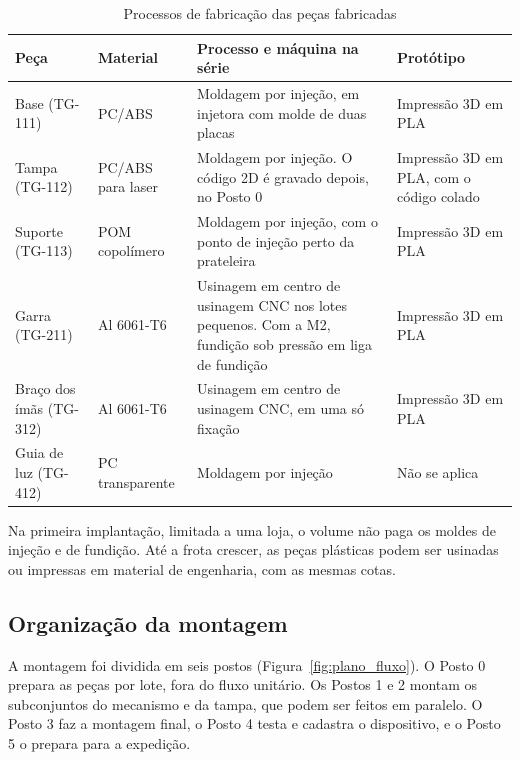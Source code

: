 \begin{table}[htbp]
    \centering
    \caption{Processos de fabricação das peças fabricadas}
    \label{tab:plano_processos}
    \footnotesize
    \renewcommand{\arraystretch}{1.3}
    \begin{tabularx}{\textwidth}{@{}
        >{\RaggedRight\arraybackslash}p{2.6cm}
        >{\RaggedRight\arraybackslash}p{2.5cm}
        >{\RaggedRight\arraybackslash}X
        >{\RaggedRight\arraybackslash}p{3.2cm}@{}}
        \toprule
        \textbf{Peça} & \textbf{Material} & \textbf{Processo e máquina na série} & \textbf{Protótipo} \\
        \midrule
        Base (TG-111) & PC/ABS & Moldagem por injeção, em injetora com molde de duas placas & Impressão 3D em PLA \\
        Tampa (TG-112) & PC/ABS para laser & Moldagem por injeção. O código 2D é gravado depois, no Posto 0 & Impressão 3D em PLA, com o código colado \\
        Suporte (TG-113) & POM copolímero & Moldagem por injeção, com o ponto de injeção perto da prateleira & Impressão 3D em PLA \\
        Garra (TG-211) & Al 6061-T6 & Usinagem em centro de usinagem CNC nos lotes pequenos. Com a M2, fundição sob pressão em liga de fundição & Impressão 3D em PLA \\
        Braço dos ímãs (TG-312) & Al 6061-T6 & Usinagem em centro de usinagem CNC, em uma só fixação & Impressão 3D em PLA \\
        Guia de luz (TG-412) & PC transparente & Moldagem por injeção & Não se aplica \\
        \bottomrule
    \end{tabularx}
\end{table}

Na primeira implantação, limitada a uma loja, o volume não paga os moldes de injeção e de fundição. Até a frota crescer, as peças plásticas podem ser usinadas ou impressas em material de engenharia, com as mesmas cotas.

\subsection{Organização da montagem}
\label{subsec:plano_organizacao}

A montagem foi dividida em seis postos (Figura~\ref{fig:plano_fluxo}). O Posto 0 prepara as peças por lote, fora do fluxo unitário. Os Postos 1 e 2 montam os subconjuntos do mecanismo e da tampa, que podem ser feitos em paralelo. O Posto 3 faz a montagem final, o Posto 4 testa e cadastra o dispositivo, e o Posto 5 o prepara para a expedição.

